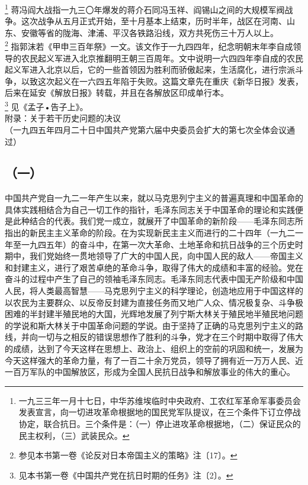 \documentclass[cn,11pt,chinese]{elegantbook}
\def\myformat#1{\hfil\hfil #1}
\begin{document}
\footnote[20]{ 一九三三年一月十七日，中华苏维埃临时中央政府、工农红军革命军事委员会发表宣言，向一切进攻革命根据地的国民党军队提议，在三个条件下订立停战协定，联合抗日。三个条件是：（一）停止进攻革命根据地，（二）保证民众的民主权利，（三）武装民众。} 蒋冯阎大战指一九三〇年爆发的蒋介石同冯玉祥、阎锡山之间的大规模军阀战争。这次战争从五月正式开始，至十月基本上结束，历时半年，战区在河南、山东、安徽等省的陇海、津浦、平汉各铁路沿线，双方共死伤三十万人以上。\\
\footnote[21]{ 参见本书第一卷《论反对日本帝国主义的策略》注〔17〕。} 指郭沫若《甲申三百年祭》一文。该文作于一九四四年，纪念明朝末年李自成领导的农民起义军进入北京推翻明王朝三百周年。文中说明一六四四年李自成的农民起义军进入北京以后，它的一些首领因为胜利而骄傲起来，生活腐化，进行宗派斗争，以致这次起义在一六四五年陷于失败。这篇文章先在重庆《新华日报》发表，后来在延安《解放日报》转载，并且在各解放区印成单行本。\\
\footnote[22]{ 见本书第一卷《中国共产党在抗日时期的任务》注〔2〕。} 见《孟子•告子上》。\\
附录：关于若干历史问题的决议\\
（一九四五年四月二十日中国共产党第六届中央委员会扩大的第七次全体会议通过）\\
\subsection*{\myformat{（一）}}
中国共产党自一九二一年产生以来，就以马克思列宁主义的普遍真理和中国革命的具体实践相结合为自己一切工作的指针，毛泽东同志关于中国革命的理论和实践便是此种结合的代表。我们党一成立，就展开了中国革命的新阶段——毛泽东同志所指出的新民主主义革命的阶段。在为实现新民主主义而进行的二十四年（一九二一年至一九四五年）的奋斗中，在第一次大革命、土地革命和抗日战争的三个历史时期中，我们党始终一贯地领导了广大的中国人民，向中国人民的敌人——帝国主义和封建主义，进行了艰苦卓绝的革命斗争，取得了伟大的成绩和丰富的经验。党在奋斗的过程中产生了自己的领袖毛泽东同志。毛泽东同志代表中国无产阶级和中国人民，将人类最高智慧——马克思列宁主义的科学理论，创造地应用于中国这样的以农民为主要群众、以反帝反封建为直接任务而又地广人众、情况极复杂、斗争极困难的半封建半殖民地的大国，光辉地发展了列宁斯大林关于殖民地半殖民地问题的学说和斯大林关于中国革命问题的学说。由于坚持了正确的马克思列宁主义的路线，并向一切与之相反的错误思想作了胜利的斗争，党才在三个时期中取得了伟大的成绩，达到了今天这样在思想上、政治上、组织上的空前的巩固和统一，发展为今天这样强大的革命力量，有了一百二十余万党员，领导了拥有近一万万人民、近一百万军队的中国解放区，形成为全国人民抗日战争和解放事业的伟大的重心。\\
\end{document}
